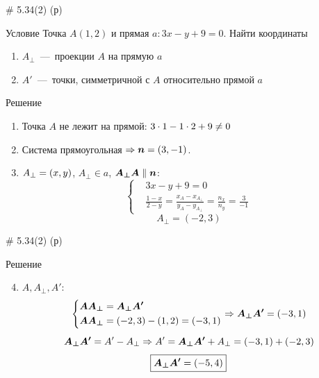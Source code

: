 \documentclass[russian]{beamer}
\begin{document}
  \begin{frame}{\# 5.34(2) (р)}
    \begin{block}{Условие}
      Точка $A(1, 2)$ и прямая $a: 3x - y + 9 = 0$.
      Найти координаты
      \begin{enumerate}
        \item $A_{\perp}$~---~проекции $A$ на прямую $a$
        \item $A'$~---~точки, симметричной с $A$ относительно прямой $a$
      \end{enumerate}
    \end{block}
    
    \pause
    
    \begin{block}{Решение}
      \begin{enumerate}
        \item Точка $A$ не лежит на прямой: $3 \hm\cdot 1 \hm- 1 \hm\cdot 2 \hm+ 9 \hm{\not=0}$
        
        \pause
        
        \item Система прямоугольная $\Rightarrow \bds n \hm= (3, -1)$.
        
        \pause
        
        \item $A_{\perp} \hm=(x, y)$, $A_{\perp} \in a$, $\bds{A_{\perp}A} \hm\parallel \bds n$:
        \[
          \left\{
            \begin{aligned}
              &3x - y + 9 = 0\\
              &\frac{1 - x}{2 - y} = \frac{x_A - x_{A_{\perp}}}{y_A - y_{A_{\perp}}} = \frac{n_x}{n_y} = \frac{3}{-1}
            \end{aligned}
          \right.
        \]
        \[
          \boxed{A_{\perp} = (-2, 3)}
        \]
      \end{enumerate}
    \end{block}
  \end{frame}
    

  \begin{frame}{\# 5.34(2) (р)}
    \begin{block}{Решение}
      \begin{enumerate}
        \setcounter{enumi}{3}
    
        \item $A, A_{\perp}, A'$:
        \[
          \left\{\begin{aligned}
            &\boldsymbol{AA_{\perp}} = \boldsymbol{A_{\perp}A'}\\
            &\boldsymbol{AA_{\perp}} = (-2, 3) - (1, 2) = (-3, 1)
          \end{aligned}\right.
          \Rightarrow \boldsymbol{A_{\perp}A'} = (-3, 1)
        \]
        \[
          \boldsymbol{A_{\perp}A'} = A' - A_{\perp} \Rightarrow A' = \boldsymbol{A_{\perp}A'} + A_{\perp}
          = (-3, 1) + (-2, 3)
        \]
        \[
          \boxed{\boldsymbol{A_{\perp}A'} = (-5, 4)}
        \]
      \end{enumerate}
    \end{block}
  \end{frame}
\end{document}
